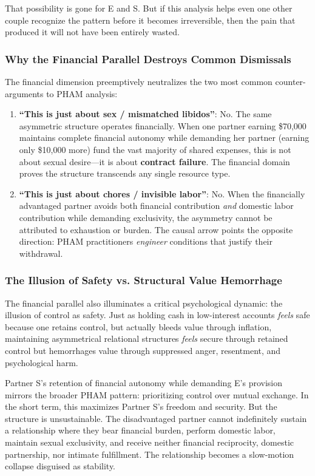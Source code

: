 \documentclass[12pt, letterpaper]{article}
\begin{document}
That possibility is gone for E and S. But if this analysis helps even one other couple recognize the pattern before it becomes irreversible, then the pain that produced it will not have been entirely wasted.

\subsubsection{Why the Financial Parallel Destroys Common Dismissals}

The financial dimension preemptively neutralizes the two most common counter-arguments to PHAM analysis:

\begin{enumerate}
    \item \textbf{``This is just about sex / mismatched libidos''}: No. The same asymmetric structure operates financially. When one partner earning \$70,000 maintains complete financial autonomy while demanding her partner (earning only \$10,000 more) fund the vast majority of shared expenses, this is not about sexual desire---it is about \textbf{contract failure}. The financial domain proves the structure transcends any single resource type.
    
    \item \textbf{``This is just about chores / invisible labor''}: No. When the financially advantaged partner avoids both financial contribution \textit{and} domestic labor contribution while demanding exclusivity, the asymmetry cannot be attributed to exhaustion or burden. The causal arrow points the opposite direction: PHAM practitioners \textit{engineer} conditions that justify their withdrawal.
\end{enumerate}

\subsubsection{The Illusion of Safety vs. Structural Value Hemorrhage}

The financial parallel also illuminates a critical psychological dynamic: the illusion of control as safety. Just as holding cash in low-interest accounts \textit{feels} safe because one retains control, but actually bleeds value through inflation, maintaining asymmetrical relational structures \textit{feels} secure through retained control but hemorrhages value through suppressed anger, resentment, and psychological harm.

Partner S's retention of financial autonomy while demanding E's provision mirrors the broader PHAM pattern: prioritizing control over mutual exchange. In the short term, this maximizes Partner S's freedom and security. But the structure is unsustainable. The disadvantaged partner cannot indefinitely sustain a relationship where they bear financial burden, perform domestic labor, maintain sexual exclusivity, and receive neither financial reciprocity, domestic partnership, nor intimate fulfillment. The relationship becomes a slow-motion collapse disguised as stability.
\end{document}
